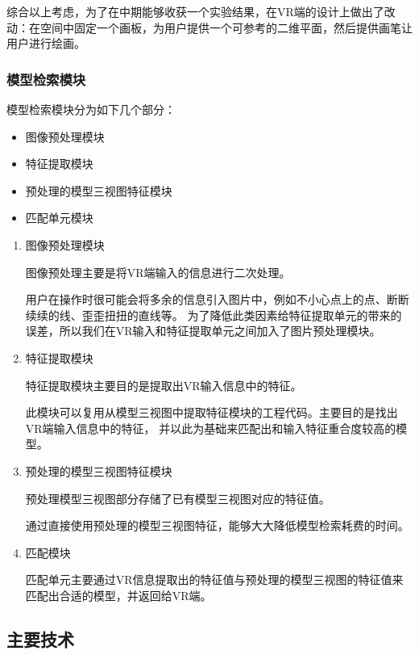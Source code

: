 \documentclass{article}
\begin{document}
 \qquad 综合以上考虑，为了在中期能够收获一个实验结果，在VR端的设计上做出了改动：在空间中固定一个画板，为用户提供一个可参考的二维平面，然后提供画笔让用户进行绘画。

\subsubsection{模型检索模块}
模型检索模块分为如下几个部分：
\begin{itemize}
    \item 图像预处理模块
    \item 特征提取模块
    \item 预处理的模型三视图特征模块
    \item 匹配单元模块
\end{itemize}

\begin{enumerate}
    \item 图像预处理模块

\qquad 图像预处理主要是将VR端输入的信息进行二次处理。

\qquad 用户在操作时很可能会将多余的信息引入图片中，例如不小心点上的点、断断续续的线、歪歪扭扭的直线等。
为了降低此类因素给特征提取单元的带来的误差，所以我们在VR输入和特征提取单元之间加入了图片预处理模块。
    
    
    \item 特征提取模块
    
\qquad 特征提取模块主要目的是提取出VR输入信息中的特征。

\qquad 此模块可以复用从模型三视图中提取特征模块的工程代码。主要目的是找出VR端输入信息中的特征，
并以此为基础来匹配出和输入特征重合度较高的模型。
    
    \item 预处理的模型三视图特征模块

\qquad 预处理模型三视图部分存储了已有模型三视图对应的特征值。

\qquad 通过直接使用预处理的模型三视图特征，能够大大降低模型检索耗费的时间。
    
    \item 匹配模块

\qquad 匹配单元主要通过VR信息提取出的特征值与预处理的模型三视图的特征值来匹配出合适的模型，并返回给VR端。

\end{enumerate}

\clearpage

\subsection{主要技术}
\end{document}
